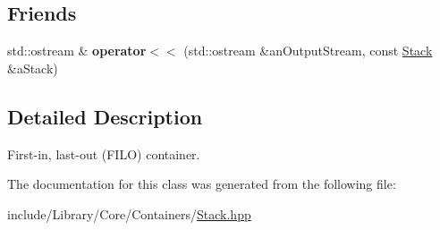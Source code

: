 \subsection*{Friends}
\begin{DoxyCompactItemize}
\item 
\mbox{\label{classlibrary_1_1core_1_1ctnr_1_1_stack_a042acac24eba66c740c7d3d48dfc0e46}} 
std\+::ostream \& {\bfseries operator$<$$<$} (std\+::ostream \&an\+Output\+Stream, const \hyperlink{classlibrary_1_1core_1_1ctnr_1_1_stack}{Stack} \&a\+Stack)
\end{DoxyCompactItemize}


\subsection{Detailed Description}
First-\/in, last-\/out (F\+I\+LO) container. 

The documentation for this class was generated from the following file\+:\begin{DoxyCompactItemize}
\item 
include/\+Library/\+Core/\+Containers/\hyperlink{_stack_8hpp}{Stack.\+hpp}\end{DoxyCompactItemize}
